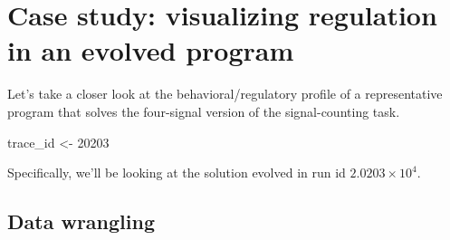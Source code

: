 \documentclass[]{book}
\newenvironment{Shaded}{\begin{snugshade}}{\end{snugshade}}
\newcommand{\DecValTok}[1]{\textcolor[rgb]{0.00,0.00,0.81}{#1}}
\newcommand{\NormalTok}[1]{#1}
\newcommand{\StringTok}[1]{\textcolor[rgb]{0.31,0.60,0.02}{#1}}
\begin{document}
\hypertarget{case-study-visualizing-regulation-in-an-evolved-program}{%
\section{Case study: visualizing regulation in an evolved program}\label{case-study-visualizing-regulation-in-an-evolved-program}}

Let's take a closer look at the behavioral/regulatory profile of a representative program that solves the four-signal version of the signal-counting task.

\begin{Shaded}
\begin{Highlighting}[]
\NormalTok{trace_id <-}\StringTok{ }\DecValTok{20203}
\end{Highlighting}
\end{Shaded}

Specifically, we'll be looking at the solution evolved in run id \ensuremath{2.0203\times 10^{4}}.

\hypertarget{data-wrangling}{%
\subsection{Data wrangling}\label{data-wrangling}}
\end{document}
